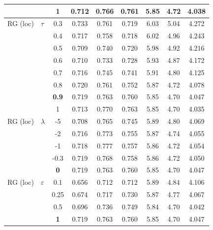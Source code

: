 \begin{longtable}{@{}l l c c c c c c c@{}}
 &  & 1 & 0.712 & 0.766 & 0.761 & 5.85 & 4.72 & 4.038 \\
\midrule
RG (loc) & $\tau$ & 0.3 & 0.733 & 0.761 & 0.719 & 6.03 & 5.04 & 4.272 \\
 &  & 0.4 & 0.717 & 0.758 & 0.718 & 6.02 & 4.96 & 4.243 \\
 &  & 0.5 & 0.709 & 0.740 & 0.720 & 5.98 & 4.92 & 4.216 \\
 &  & 0.6 & 0.710 & 0.733 & 0.728 & 5.93 & 4.87 & 4.172 \\
 &  & 0.7 & 0.716 & 0.745 & 0.741 & 5.91 & 4.80 & 4.125 \\
 &  & 0.8 & 0.720 & 0.761 & 0.752 & 5.87 & 4.72 & 4.078 \\
 &  & \textbf{0.9} & 0.719 & 0.763 & 0.760 & 5.85 & 4.70 & 4.047 \\
 &  & 1 & 0.713 & 0.770 & 0.763 & 5.85 & 4.70 & 4.035 \\
\midrule
RG (loc) & $\lambda$ & {-}5 & 0.708 & 0.765 & 0.745 & 5.89 & 4.80 & 4.069 \\
 &  & {-}2 & 0.716 & 0.773 & 0.755 & 5.87 & 4.74 & 4.055 \\
 &  & {-}1 & 0.718 & 0.777 & 0.757 & 5.86 & 4.72 & 4.054 \\
 &  & {-}0.3 & 0.719 & 0.768 & 0.758 & 5.86 & 4.72 & 4.050 \\
 &  & \textbf{0} & 0.719 & 0.763 & 0.760 & 5.85 & 4.70 & 4.047 \\
\midrule
RG (loc) & $\varepsilon$ & 0.1 & 0.656 & 0.712 & 0.712 & 5.89 & 4.84 & 4.106 \\
 &  & 0.25 & 0.674 & 0.717 & 0.730 & 5.87 & 4.77 & 4.067 \\
 &  & 0.5 & 0.696 & 0.736 & 0.749 & 5.84 & 4.70 & 4.042 \\
 &  & \textbf{1} & 0.719 & 0.763 & 0.760 & 5.85 & 4.70 & 4.047 \\
\end{longtable}
